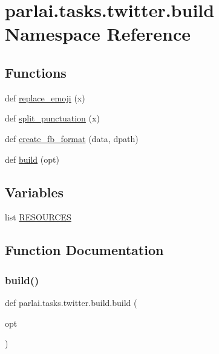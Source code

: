 \hypertarget{namespaceparlai_1_1tasks_1_1twitter_1_1build}{}\section{parlai.\+tasks.\+twitter.\+build Namespace Reference}
\label{namespaceparlai_1_1tasks_1_1twitter_1_1build}
\subsection*{Functions}
\begin{DoxyCompactItemize}
\item 
def \hyperlink{namespaceparlai_1_1tasks_1_1twitter_1_1build_aea2acf2542f3fb1294fa121bb7cb1a76}{replace\+\_\+emoji} (x)
\item 
def \hyperlink{namespaceparlai_1_1tasks_1_1twitter_1_1build_a6296215f669301c1e46b7588e1291ae7}{split\+\_\+punctuation} (x)
\item 
def \hyperlink{namespaceparlai_1_1tasks_1_1twitter_1_1build_ab36b25b09bea28cdf3278f910e5e9ff6}{create\+\_\+fb\+\_\+format} (data, dpath)
\item 
def \hyperlink{namespaceparlai_1_1tasks_1_1twitter_1_1build_a8faa6a4ae6f2adaa22f068cc6781898d}{build} (opt)
\end{DoxyCompactItemize}
\subsection*{Variables}
\begin{DoxyCompactItemize}
\item 
list \hyperlink{namespaceparlai_1_1tasks_1_1twitter_1_1build_a2c0605933d8e8d1526253c362e5db67e}{R\+E\+S\+O\+U\+R\+C\+ES}
\end{DoxyCompactItemize}


\subsection{Function Documentation}
\mbox{\label{namespaceparlai_1_1tasks_1_1twitter_1_1build_a8faa6a4ae6f2adaa22f068cc6781898d}} 
\subsubsection{\texorpdfstring{build()}{build()}}
{\footnotesize\ttfamily def parlai.\+tasks.\+twitter.\+build.\+build (\begin{DoxyParamCaption}\item[{}]{opt }\end{DoxyParamCaption})}

